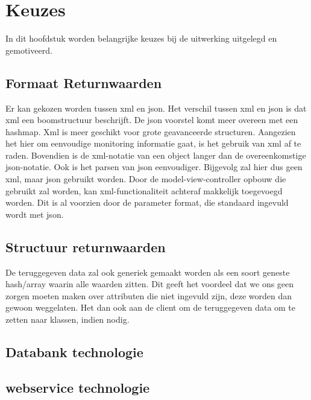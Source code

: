\newpage
\chapter{Keuzes}
In dit hoofdstuk worden belangrijke keuzes bij de uitwerking uitgelegd en gemotiveerd.

\section{Formaat Returnwaarden}
\npar
Er kan gekozen worden tussen xml en json. Het verschil tussen xml en json is dat xml een boomstructuur beschrijft. De json voorstel komt meer overeen met een hashmap. Xml is meer geschikt voor grote geavanceerde structuren. Aangezien het hier om eenvoudige monitoring informatie gaat, is het gebruik van xml af te raden. Bovendien is de xml-notatie van een object langer dan de overeenkomstige json-notatie. Ook is het parsen van json eenvoudiger. Bijgevolg zal hier dus geen xml, maar json gebruikt worden. Door de model-view-controller opbouw die gebruikt zal worden, kan xml-functionaliteit achteraf makkelijk toegevoegd worden. Dit is al voorzien door de parameter format, die standaard ingevuld wordt met json.
\npar

\section{Structuur returnwaarden}
De teruggegeven data zal ook generiek gemaakt worden als een soort geneste hash/array waarin alle waarden zitten. Dit geeft het voordeel dat we ons geen zorgen moeten maken over attributen die niet ingevuld zijn, deze worden dan gewoon weggelaten. Het dan ook aan de client om de teruggegeven data om te zetten naar klassen, indien nodig.

\section{Databank technologie}

\section{webservice technologie}